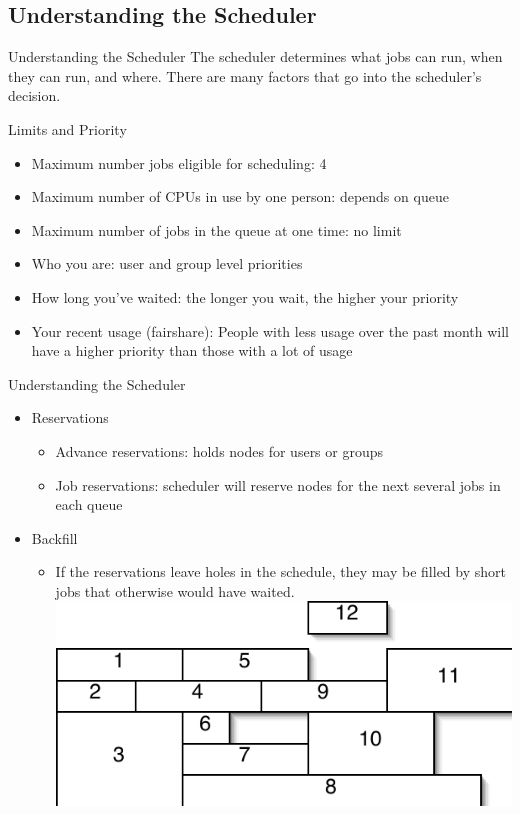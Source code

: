 \documentclass{beamer}
\begin{document}
\subsection{Understanding the Scheduler}
\begin{frame}{Understanding the Scheduler}
The scheduler determines what jobs can run, when they can run, and where.  There
are many factors that go into the scheduler's decision.
   \begin{block}{Limits and Priority}
    \begin{itemize}
    \item<1-> Maximum number jobs eligible for scheduling: 4
    \item<1-> Maximum number of CPUs in use by one person: depends on queue
    \item<1-> Maximum number of jobs in the queue at one time: no limit
    \end{itemize}
    \begin{itemize}
    \item<2-> Who you are: user and group level priorities
    \item<2-> How long you've waited: the longer you wait, the higher your
priority
    \item<2-> Your recent usage (fairshare): People with less usage over the
past month will have a higher priority than those with a lot of usage
    \end{itemize}
   \end{block}
\end{frame}
\begin{frame}{Understanding the Scheduler}
  \begin{itemize}
  \item<1-> Reservations
    \begin{itemize}
    \item<1-> Advance reservations: holds nodes for users or groups
    \item<1-> Job reservations: scheduler will reserve nodes for the next
several jobs in each queue
    \end{itemize}
  \item<2-> Backfill
    \begin{itemize}
    \item<2-> If the reservations leave holes in the schedule, they may be
filled by short jobs that otherwise would have waited.\\
	\includegraphics{job-grid}
    \end{itemize}
  \end{itemize}
\end{frame}
\end{document}
